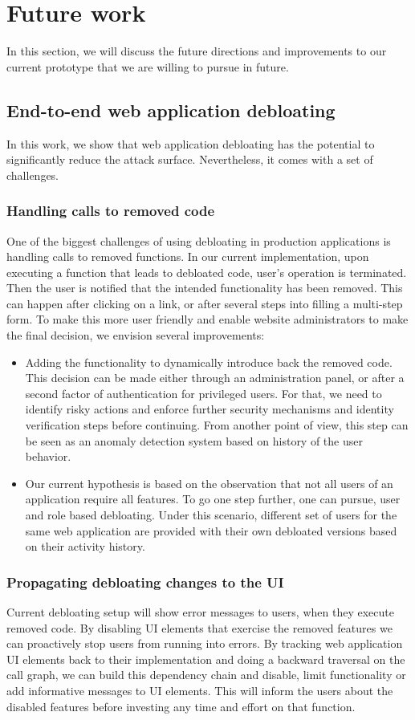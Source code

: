 \section{Future work}
In this section, we will discuss the future directions and improvements to our current prototype that we are willing to pursue in future.

\subsection{End-to-end web application debloating}
In this work, we show that web application debloating has the potential to significantly reduce the attack surface. Nevertheless, it comes with a set of challenges.

\subsubsection{Handling calls to removed code}
One of the biggest challenges of using debloating in production applications is handling calls to removed functions. In our current implementation, upon executing a function that leads to debloated code, user's operation is terminated. Then the user is notified that the intended functionality has been removed. This can happen after clicking on a link, or after several steps into filling a multi-step form. To make this more user friendly and enable website administrators to make the final decision, we envision several improvements:
\begin{itemize}
  \item Adding the functionality to dynamically introduce back the removed code. This decision can be made either through an administration panel, or after a second factor of authentication for privileged users. For that, we need to identify risky actions and
  enforce further security mechanisms and identity verification steps before continuing. From another point of view, this step can be seen as an anomaly detection system based on history of the user behavior.
  \item Our current hypothesis is based on the observation that not all users of an application require all features. To go one step further, one can pursue, user and role based debloating. Under this scenario, different set of users for the same web application are provided with their own debloated versions based on their activity history.
\end{itemize}

\subsubsection{Propagating debloating changes to the UI}
Current debloating setup will show error messages to users, when they execute removed code. By disabling UI elements that exercise the removed features we can proactively stop users from running into errors. By tracking web application UI elements back to their implementation and doing a backward traversal on the call graph, we can build this dependency chain and disable, limit functionality or add informative messages to UI elements. This will inform the users about the disabled features before investing any time and effort on that function.

